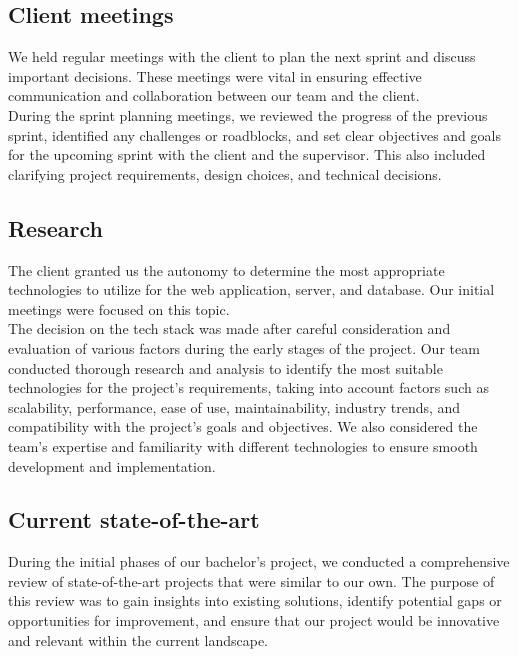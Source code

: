 \subsection{Client meetings}

We held regular meetings with the client to plan the next sprint and discuss important decisions. These meetings were vital in ensuring effective communication and collaboration between our team and the client. \\

\noindent
During the sprint planning meetings, we reviewed the progress of the previous sprint, identified any challenges or roadblocks, and set clear objectives and goals for the upcoming sprint with the client and the supervisor. This also included clarifying project requirements, design choices, and technical decisions. 

\subsection{Research}

The client granted us the autonomy to determine the most appropriate technologies to utilize for the web application, server, and database. Our initial meetings were focused on this topic. \\

\noindent
The decision on the tech stack was made after careful consideration and evaluation of various factors during the early stages of the project. Our team conducted thorough research and analysis to identify the most suitable technologies for the project's requirements, taking into account factors such as scalability, performance, ease of use, maintainability, industry trends, and compatibility with the project's goals and objectives. We also considered the team's expertise and familiarity with different technologies to ensure smooth development and implementation. 

\subsection{Current state-of-the-art}

During the initial phases of our bachelor’s project, we conducted a comprehensive review of state-of-the-art projects that were similar to our own. The purpose of this review was to gain insights into existing solutions, identify potential gaps or opportunities for improvement, and ensure that our project would be innovative and relevant within the current landscape. \\

